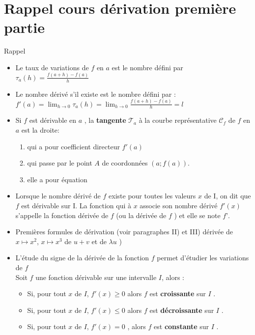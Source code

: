 \documentclass[11pt,a4paper]{article}
\theoremstyle{break}
\begin{document}
	
	\begin{center}
		\shadowbox{\begin{large}
				\textcolor{black}{DÉRIVÉE : Deuxième partie}
			\end{large}}
		\end{center}
	\tableofcontents

\section{Rappel cours dérivation première partie}
	\begin{bclogo}[couleur = yellow!30, arrondi = 0.1,logo=\bcbook]{Rappel}
		\begin{itemize}
			\item \boldmath	Le {taux de variations} de $f$ en $a$  est le nombre défini par 
				$\tau_a(h)=\frac{f(a+h)-f(a)}{h}$
			\item Le nombre dérivé s'il existe est le nombre défini par  :$ f'(a)=\displaystyle\lim_{h\to0}\tau_a(h)=\displaystyle\lim_{h\to0}\frac{f(a+h)-f(a)}{h}=l $
			\item 	Si $f$ est dérivable en $a$ , la \textbf{tangente} $\mathscr{T}_a$ à la courbe représentative $\mathscr{C}_f$ de $f$ en $a$ est la droite:\begin{enumerate}
				\item qui a pour coefficient directeur $f'(a)$
				\item qui passe par le point $A$ de coordonnées $(a;f(a))$.
				\item elle a pour équation 
			\end{enumerate}
		\item Lorsque le nombre dérivé de $f$ existe pour toutes les valeurs $x$ de I, on dit que $f$ est dérivable sur I.
		La fonction qui à $x$ associe son nombre dérivé $f'(x)$ s’appelle la fonction dérivée de $f$ (ou la dérivée
		de $f$ ) et elle se note $f’$.
		\item Premières formules de dérivation (voir paragraphes II) et III) dérivée de $x\mapsto x^2$, $x\mapsto x^3$ de $u+v$ et de $\lambda u$ )
\item L'étude du signe de la dérivée de la fonction $f$ permet d'étudier les variations de $f$\\
Soit $f$ une fonction dérivable sur une intervalle  $I$, alors :
\begin{itemize}
	\item Si, pour tout $x$ de $I$, $f'(x)  \geq 0 $  alors $f$ est \textbf{ croissante} sur $I$ .
	\item Si, pour tout $x$ de $I$, $f'(x) \leq 0 $  alors $f$ est \textbf{ décroissante} sur $I$ .
	\item Si, pour tout $x$ de $I$, $f'(x) = 0 $ , alors $f$ est \textbf{ constante } sur $I$ .
\end{itemize} 
		\end{itemize}
	\end{bclogo}
\end{document}
